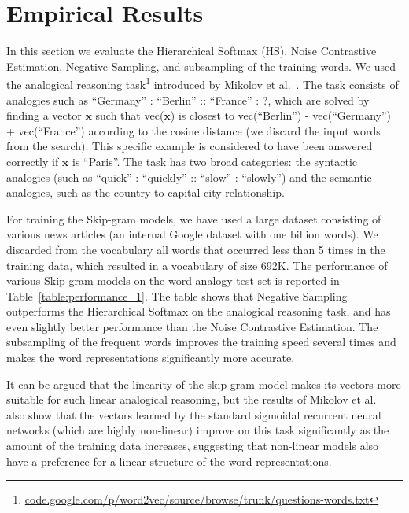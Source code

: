 \documentclass{article}
\begin{document}
\section{Empirical Results}

In this section we evaluate the Hierarchical Softmax (HS), Noise Contrastive Estimation,
Negative Sampling, and subsampling of the training words. We used
the analogical reasoning task\footnote{\url{code.google.com/p/word2vec/source/browse/trunk/questions-words.txt}}
introduced by Mikolov et al.~\cite{mikolov}.
The task consists of analogies such as ``Germany'' : ``Berlin'' :: ``France'' : ?,
which are solved by finding a vector $\mathbf{x}$
such that vec($\mathbf{x}$) is closest to
vec(``Berlin'') - vec(``Germany'') + vec(``France'') according to the
cosine distance (we discard the input words from the search).
This specific example is considered to have been
answered correctly if $\mathbf{x}$ is ``Paris''.  The task has
two broad categories: the syntactic analogies (such as
``quick'' : ``quickly'' :: ``slow'' : ``slowly'') and the semantic analogies, such
as the country to capital city relationship.

For training the Skip-gram models, we have used a large dataset
consisting of various news articles (an internal Google dataset with one billion words).
We discarded from the vocabulary all words that occurred
less than 5 times in the training data, which resulted in a vocabulary of size 692K.
The performance of various Skip-gram models on the word
analogy test set is reported in Table~\ref{table:performance_1}.
The table shows that Negative Sampling
outperforms the Hierarchical Softmax on the analogical
reasoning task, and has even slightly better performance than the Noise Contrastive Estimation.
The subsampling of the frequent words improves the training speed several times
and makes the word representations significantly more accurate.

It can be argued that the linearity of the skip-gram model makes its vectors
more suitable for such linear analogical reasoning, but the results of
Mikolov et al.~\cite{mikolov} also show that the vectors learned by the
standard sigmoidal recurrent neural networks (which are highly non-linear)
improve on this task significantly as the amount of the training data increases,
suggesting that non-linear models also have a preference for a linear
structure of the word representations.
\end{document}
